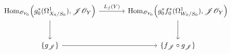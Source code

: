 \[
\begin{tikzcd}[column sep=large,row sep=large]
  \operatorname{Hom}_{\mathscr O_{Y_0}}
    \!\left(
      g_0^*(\Omega^1_{X_0/S_0}),
      \mathscr J\mathscr O_Y
    \right)
    \arrow[r,"L_f(Y)"]
    \arrow[d]
  &
  \operatorname{Hom}_{\mathscr O_{Y_0}}
    \!\left(
      g_0^*f_0^*(\Omega^1_{W_0/S_0}),
      \mathscr J\mathscr O_Y
    \right)
    \arrow[d]
  \\
  \{g_{\mathscr J}\}
    \arrow[r]
  &
  \{f_{\mathscr J}\circ g_{\mathscr J}\}
\end{tikzcd}
\]
